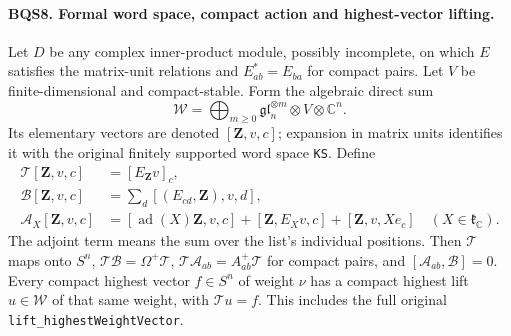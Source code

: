 \paragraph{BQS8. Formal word space, compact action and highest-vector lifting.}
\label{claim:BQS8}
Let $D$ be any complex inner-product module, possibly incomplete, on
which $E$ satisfies the matrix-unit relations and
$E_{ab}^*=E_{ba}$ for compact pairs.  Let $V$ be finite-dimensional
and compact-stable.  Form the algebraic direct sum
\[
 \mathcal W=\bigoplus_{m\ge0}
             \mathfrak{gl}_n^{\otimes m}\otimes V\otimes\mathbb C^n .
 \tag{BQS.22}
\]
Its elementary vectors are denoted $[\mathbf Z,v,c]$; expansion in
matrix units identifies it with the original finitely supported word
space \texttt{KS}.  Define
\[
\begin{aligned}
 \mathcal T[\mathbf Z,v,c]&=[E_{\mathbf Z}v]_c,\\
 \mathcal B[\mathbf Z,v,c]&=\sum_d[(E_{cd},\mathbf Z),v,d],\\
 \mathcal A_X[\mathbf Z,v,c]&=
 [\operatorname{ad}(X)\mathbf Z,v,c]+[\mathbf Z,E_Xv,c]
                 +[\mathbf Z,v,Xe_c]\quad(X\in\mathfrak k_{\mathbb C}).
\end{aligned}
\tag{BQS.23}
\]
The adjoint term means the sum over the list's individual positions.
Then $\mathcal T$ maps onto $S^n$,
$\mathcal T\mathcal B=\Omega^+\mathcal T$,
$\mathcal T\mathcal A_{ab}=A^+_{ab}\mathcal T$ for compact pairs, and
$[\mathcal A_{ab},\mathcal B]=0$.
Every compact highest vector $f\in S^n$ of weight $\nu$ has a compact
highest lift $u\in\mathcal W$ of that same weight, with $\mathcal T u=f$.
This includes the full original \texttt{lift\_highestWeightVector}.

